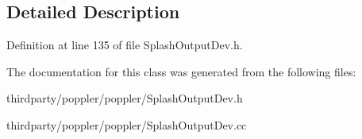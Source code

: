 \subsection{Detailed Description}


Definition at line 135 of file Splash\+Output\+Dev.\+h.



The documentation for this class was generated from the following files\+:\begin{DoxyCompactItemize}
\item 
thirdparty/poppler/poppler/Splash\+Output\+Dev.\+h\item 
thirdparty/poppler/poppler/Splash\+Output\+Dev.\+cc\end{DoxyCompactItemize}
